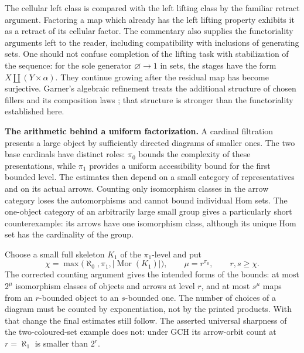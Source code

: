The cellular left class is compared with the left lifting class by the familiar retract argument. Factoring a map which already has the left lifting property exhibits it as a retract of its cellular factor. The commentary also supplies the functoriality arguments left to the reader, including compatibility with inclusions of generating sets. One should not confuse completion of the lifting task with stabilization of the sequence: for the sole generator $\varnothing\to1$ in sets, the stages have the form $X\amalg(Y\times\alpha)$. They continue growing after the residual map has become surjective. Garner's algebraic refinement treats the additional structure of chosen fillers and its composition laws \citep{Garner2009}; that structure is stronger than the functoriality established here.

\medskip\noindent\textbf{The arithmetic behind a uniform factorization.}
A cardinal filtration presents a large object by sufficiently directed diagrams of smaller ones. The two base cardinals have distinct roles: $\pi_0$ bounds the complexity of these presentations, while $\pi_1$ provides a uniform accessibility bound for the first bounded level. The estimates then depend on a small category of representatives and on its actual arrows. Counting only isomorphism classes in the arrow category loses the automorphisms and cannot bound individual Hom sets. The one-object category of an arbitrarily large small group gives a particularly short counterexample: its arrows have one isomorphism class, although its unique Hom set has the cardinality of the group.

Choose a small full skeleton $K_1$ of the $\pi_1$-level and put
\[
 \chi=\max\bigl(\aleph_0,\pi_1,|\operatorname{Mor}(K_1)|\bigr),
 \qquad \mu=r^{\pi_0},\qquad r,s\geq\chi.
\]
The corrected counting argument gives the intended forms of the bounds: at most $2^\mu$ isomorphism classes of objects and arrows at level $r$, and at most $s^\mu$ maps from an $r$-bounded object to an $s$-bounded one. The number of choices of a diagram must be counted by exponentiation, not by the printed products. With that change the final estimates still follow. The asserted universal sharpness of the two-coloured-set example does not: under GCH its arrow-orbit count at $r=\aleph_1$ is smaller than $2^r$.


